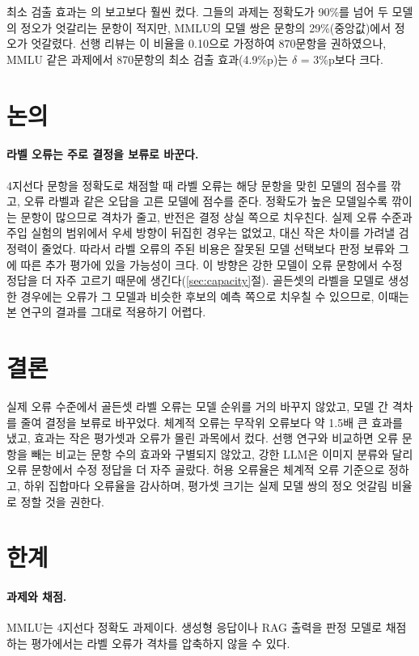 \documentclass[11pt]{article}
\newcommand{\pp}{\%p}
\begin{document}
최소 검출 효과는 \citet{card-etal-2020-little}의 보고보다 훨씬 컸다. 그들의 과제는 정확도가 90\%를 넘어 두 모델의 정오가 엇갈리는 문항이 적지만, MMLU의 모델 쌍은 문항의 29\%(중앙값)에서 정오가 엇갈렸다. 선행 리뷰는 이 비율을 0.10으로 가정하여 870문항을 권하였으나, MMLU 같은 과제에서 870문항의 최소 검출 효과(4.9\%p)는 $\delta$ = 3\pp{}보다 크다.

\section{논의}

\paragraph{라벨 오류는 주로 결정을 보류로 바꾼다.}
4지선다 문항을 정확도로 채점할 때 라벨 오류는 해당 문항을 맞힌 모델의 점수를 깎고, 오류 라벨과 같은 오답을 고른 모델에 점수를 준다. 정확도가 높은 모델일수록 깎이는 문항이 많으므로 격차가 줄고, 반전은 결정 상실 쪽으로 치우친다. 실제 오류 수준과 주입 실험의 범위에서 우세 방향이 뒤집힌 경우는 없었고, 대신 작은 차이를 가려낼 검정력이 줄었다. 따라서 라벨 오류의 주된 비용은 잘못된 모델 선택보다 판정 보류와 그에 따른 추가 평가에 있을 가능성이 크다. 이 방향은 강한 모델이 오류 문항에서 수정 정답을 더 자주 고르기 때문에 생긴다(\ref{sec:capacity}절). 골든셋의 라벨을 모델로 생성한 경우에는 오류가 그 모델과 비슷한 후보의 예측 쪽으로 치우칠 수 있으므로, 이때는 본 연구의 결과를 그대로 적용하기 어렵다.

\section{결론}

실제 오류 수준에서 골든셋 라벨 오류는 모델 순위를 거의 바꾸지 않았고, 모델 간 격차를 줄여 결정을 보류로 바꾸었다. 체계적 오류는 무작위 오류보다 약 1.5배 큰 효과를 냈고, 효과는 작은 평가셋과 오류가 몰린 과목에서 컸다. 선행 연구와 비교하면 오류 문항을 빼는 비교는 문항 수의 효과와 구별되지 않았고, 강한 LLM은 이미지 분류와 달리 오류 문항에서 수정 정답을 더 자주 골랐다. 허용 오류율은 체계적 오류 기준으로 정하고, 하위 집합마다 오류율을 감사하며, 평가셋 크기는 실제 모델 쌍의 정오 엇갈림 비율로 정할 것을 권한다.
\label{sec:end-of-body}

\section*{한계}

\paragraph{과제와 채점.}
MMLU는 4지선다 정확도 과제이다. 생성형 응답이나 RAG 출력을 판정 모델로 채점하는 평가에서는 라벨 오류가 격차를 압축하지 않을 수 있다.
\end{document}

